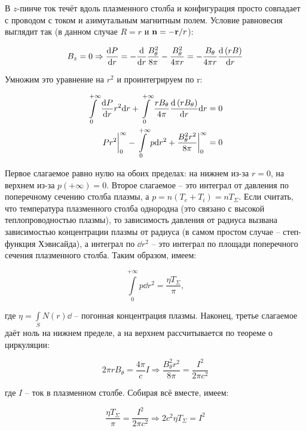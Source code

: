 \documentclass[10pt, a4paper]{article}
\begin{document}
В $z$-пинче ток течёт вдоль плазменного столба и конфигурация просто совпадает с проводом с током и азимутальным магнитным полем. Условие равновесия выглядит так (в данном случае $R=r$ и $\vb{n}=-\vb{r}/r$):

\begin{equation*}
	B_z = 0 \Rightarrow \dv{P}{r} = -\dv{}{r}\frac{B_\theta^2}{8\pi} - \frac{B_\theta^2}{4\pi r} = -\frac{B_\theta}{4\pi r}\dv{\left( rB \right)}{r}
\end{equation*}

Умножим это уравнение на $r^2$ и проинтегрируем по r:

\begin{align*}
	\int\limits_0^{+\infty}\dv{P}{r}r^2\dd r + \int\limits_0^{+\infty}\frac{rB_\theta}{4\pi}\dv{\left( rB_\theta \right)}{r}\dd r &= 0 \\
	Pr^2\bigg|_0^{\infty} - \int\limits_0^{+\infty}p\dd r^2 + \frac{B_\theta^2 r^2}{8\pi}\bigg|_0^{\infty} &= 0
\end{align*}

Первое слагаемое равно нулю на обоих пределах: на нижнем из-за $r=0$, на верхнем из-за $p(+\infty)=0$. Второе слагаемое -- это интеграл от давления по поперечному сечению столба плазмы, а $p=n(T_e+T_i)=nT_\Sigma$. Если считать, что температура плазменного столба однородна (это связано с высокой теплопроводностью плазмы), то зависимость давления от радиуса вызвана зависимостью концентрации плазмы от радиуса (в самом простом случае -- степ-функция Хэвисайда), а интеграл по $\dd r^2$ -- это интеграл по площади поперечного сечения плазменного столба. Таким образом, имеем:

\begin{equation*}
	\int\limits_0^{+\infty}p\dd r^2 = \frac{\eta T_\Sigma}{\pi},
\end{equation*}

где $\eta = \int\limits_SN(r)\dd$ -- погонная концентрация плазмы.
Наконец, третье слагаемое даёт ноль на нижнем пределе, а на верхнем рассчитывается по теореме о циркуляции:

\begin{equation*}
	2\pi r B_\theta = \frac{4\pi}{c}I \Rightarrow \frac{B_\theta^2r^2}{8\pi} = \frac{I^2}{2\pi c^2}
\end{equation*}

где $I$ -- ток в плазменном столбе. Собирая всё вместе, имеем:

\begin{equation*}
	\frac{\eta T_\Sigma}{\pi} = \frac{I^2}{2\pi c^2} \Rightarrow 2c^2 \eta T_\Sigma = I^2
\end{equation*}
\end{document}

